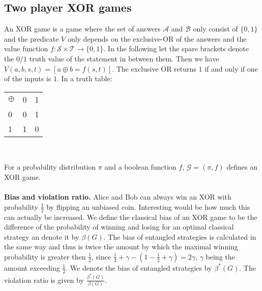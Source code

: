 \subsection{Two player XOR games}
An XOR game is a game where the set of answers $\mathcal{A}$ and $\mathcal{B}$ only consist of $\{ 0,1 \}$ and the predicate $V$ only depends on the exclusive-OR of the answers and the value function $f : \mathcal{S} \times \mathcal{T} \rightarrow \{ 0,1 \}$. In the following let the spare brackets denote the $0/1$ truth value of the statement in between them. Then we have $V(a,b,s,t) = \left[ a \oplus b = f(s,t) \right]$. 
The exclusive OR returns $1$ if and only if one of the inputs is $1$. In a truth table: \\
\begin{center}
\begin{tabular}{l | c r }
$\oplus$ & 0 & 1 \\
\cline{1-3} 

0 & 0 & 1 \\
1 & 1 & 0 
\end{tabular}\\
\end{center}

For a probability distribution $\pi$ and a boolean function $f$, $\mathcal{G}= (\pi, f)$ defines an XOR game.\\ \\
\textbf{Bias and violation ratio.} Alice and Bob can always win an XOR with probability $\frac{1}{2}$ by flipping an unbiased coin. Interesting would be how much this can actually be increased. We define the classical bias of an XOR game to be the difference of the probability of winning and losing for an optimal classical strategy an denote it by $\beta(G)$. The bias of entangled strategies is calculated in the same way and thus is twice the amount by which the maximal winning probability is greater then $\frac{1}{2}$, since $\frac{1}{2}+\gamma - (1 - \frac{1}{2} + \gamma) = 2 \gamma$, $\gamma$ being the amount exceeding $\frac{1}{2}$. We denote the bias of entangled strategies by $\beta^*(G)$. The violation ratio is given by $\frac{\beta^*(G)}{\beta(G)}$.\\ \\

